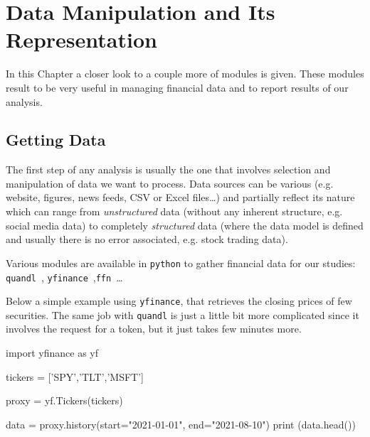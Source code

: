 \chapter{Data Manipulation and Its Representation}
\label{sec:datamanip}
In this Chapter a closer look to a couple more of modules is given. These modules result to be very useful in managing financial data and to report results of our analysis.

\section{Getting Data}\label{getting-data}

The first step of any analysis is usually the one that involves selection and manipulation of data we want to process. Data sources can be various (e.g. website, figures, news feeds, CSV or Excel files\ldots) and partially reflect its nature which can range from \emph{unstructured} data (without any inherent structure, e.g. social media data) to completely \emph{structured} data (where the data model is defined and usually there is no error associated, e.g. stock trading data).

Various modules are available in \texttt{python} to gather financial data for our studies: \texttt{quandl}~\cite{bib:quandl}, \texttt{yfinance}~\cite{bib:yfinance},\texttt{ffn}~\cite{bib:ffn}\ldots

Below a simple example using \texttt{yfinance}, that retrieves the closing prices of few securities. The same job with \texttt{quandl} is just a little bit more complicated since it involves the request for a token, but it just takes few minutes more.  

\begin{ipythonnon}
import yfinance as yf

tickers = ['SPY','TLT','MSFT']
	
proxy = yf.Tickers(tickers)

data = proxy.history(start="2021-01-01", end="2021-08-10")
print (data.head())
\end{ipythonnon}
\begin{ioutput}
\end{ioutput}

